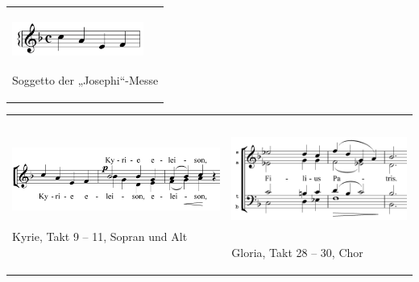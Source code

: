 \begin{center}
\begin{minipage}{4.736cm}
\begin{flushleft}
\tablefirsthead{}
\tablehead{}
\tabletail{}
\tablelasttail{}
\begin{supertabular}{m{4.5360003cm}}

\begin{figure}
\img{}
\caption{}
\end{figure}

\includegraphics[width=4.307cm,height=1.233cm]{pictures/zulassungsarbeit-img108.png}

Soggetto der „Josephi“-Messe\\
\end{supertabular}
\end{flushleft}
\end{minipage}
\end{center}
\begin{flushleft}
\tablefirsthead{}
\tablehead{}
\tabletail{}
\tablelasttail{}
\begin{supertabular}{m{8.196cm}m{7.783cm}}

\includegraphics[width=7.678cm,height=2.325cm]{pictures/zulassungsarbeit-img109.png}

\begin{figure}
\img{}
\caption{}
\end{figure}

Kyrie, Takt 9 – 11, Sopran und Alt &

\includegraphics[width=6.592cm,height=3.339cm]{pictures/zulassungsarbeit-img110.png}

Gloria, Takt 28 – 30, Chor\\
\end{supertabular}
\end{flushleft}
